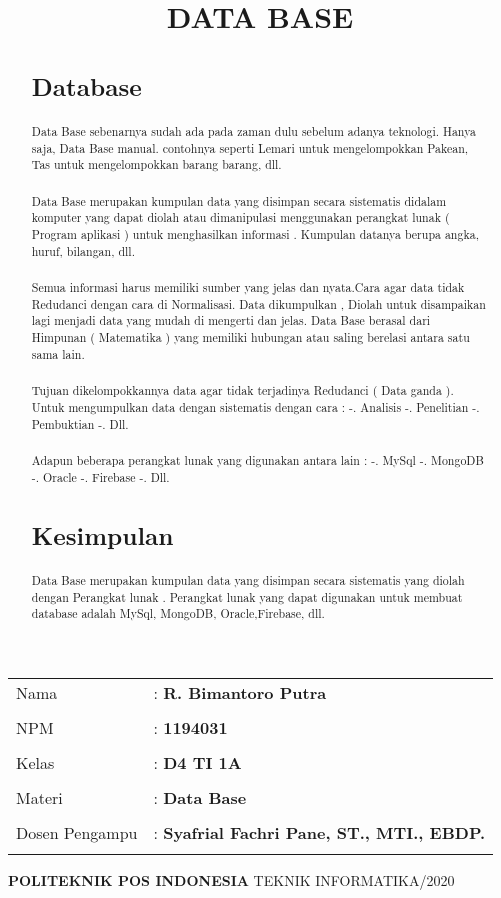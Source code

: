 \documentclass[10pt]{article}
\title{DATA BASE}
\author{}
\begin{document}
\maketitle
\begin{center}
\begin{tabular}{ll}
Nama 				&: \textbf {R. Bimantoro Putra}\tabularnewline\\
NPM       			&: \textbf {1194031}\tabularnewline\\
Kelas 				&: \textbf {D4 TI 1A}\tabularnewline\\
Materi 				&: \textbf {Data Base}\tabularnewline\\
Dosen Pengampu		&: \textbf {Syafrial Fachri Pane, ST., MTI., EBDP.}\tabularnewline\\
\end{tabular}
\newline
\newline
\newline
\newline
\newline
\newline
\newline
\textbf {POLITEKNIK POS INDONESIA} \linebreak
TEKNIK INFORMATIKA/2020
\end{center}
\newpage
\begin{abstract}
\section{Database}
\subparagraph{} Data Base sebenarnya sudah ada pada zaman dulu sebelum adanya teknologi. Hanya saja, Data Base manual. contohnya seperti Lemari untuk mengelompokkan Pakean, Tas untuk mengelompokkan barang barang, dll.
\subparagraph{}Data Base merupakan kumpulan data yang disimpan secara sistematis didalam komputer yang dapat diolah atau dimanipulasi menggunakan perangkat lunak ( Program aplikasi ) untuk menghasilkan informasi . Kumpulan datanya berupa angka, huruf, bilangan, dll.
\subparagraph{} Semua informasi harus memiliki sumber yang jelas dan nyata.Cara agar data tidak Redudanci dengan cara di Normalisasi. Data dikumpulkan , Diolah untuk disampaikan lagi  menjadi data yang mudah di mengerti dan jelas. Data Base berasal dari Himpunan ( Matematika ) yang memiliki hubungan atau saling berelasi antara satu sama lain. 
\subparagraph{}Tujuan dikelompokkannya data agar tidak terjadinya Redudanci ( Data ganda ). Untuk mengumpulkan data dengan sistematis dengan cara :
  -. Analisis
  -. Penelitian
  -. Pembuktian 
  -. Dll.
  \subparagraph{}Adapun beberapa perangkat lunak yang digunakan antara lain :
  -. MySql
  -. MongoDB
  -. Oracle
  -. Firebase
  -. Dll.
  \section{Kesimpulan}
  \subparagraph{}Data Base merupakan kumpulan data yang disimpan secara sistematis yang diolah dengan Perangkat lunak . Perangkat lunak yang dapat digunakan untuk membuat database adalah MySql, MongoDB, Oracle,Firebase, dll.
  
  
 
\end{abstract}
\end{document}
